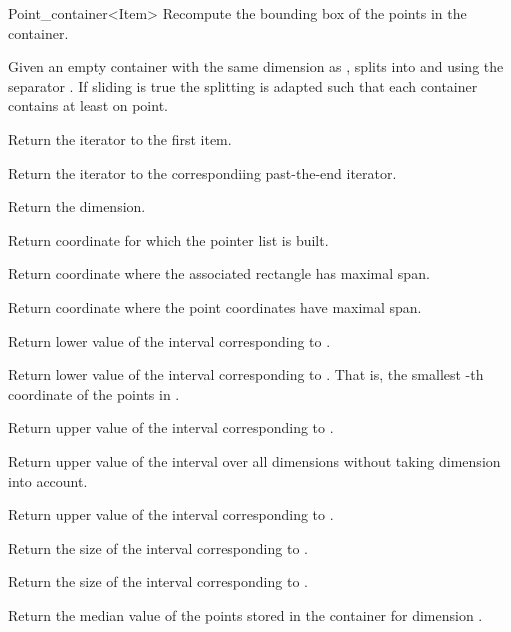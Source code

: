 \begin{ccRefClass}{Point_container<Item>}
{Recompute the bounding box of the points in the container.}

{Given an empty container  with the same dimension as , splits  into
 and  using the separator . If sliding is true the splitting is adapted
such that each container contains at least on point.}

{
Return the iterator to the first item.
}

{
Return the iterator to the correspondiing past-the-end iterator.
}

{
Return the dimension.
}

{
Return coordinate for which the pointer list is built.
}

{
Return coordinate where the associated rectangle has maximal span.
}

{
Return coordinate where the point coordinates have maximal span.
}

{
Return lower value of the interval corresponding to
.
}


{
Return lower value of the interval corresponding to
. That is, the smallest
-th coordinate of the points in
.
}


{
Return upper value of the interval corresponding to
.
}

{
Return upper value of the interval over all dimensions
without taking dimension  into account.
}

{
Return upper value of the interval corresponding to
.
}

{
Return the size of the interval corresponding to .
}

{
Return the size of the interval corresponding to .
}

{
Return the median value of the points stored in the container for
dimension .
}


\end{ccRefClass}
